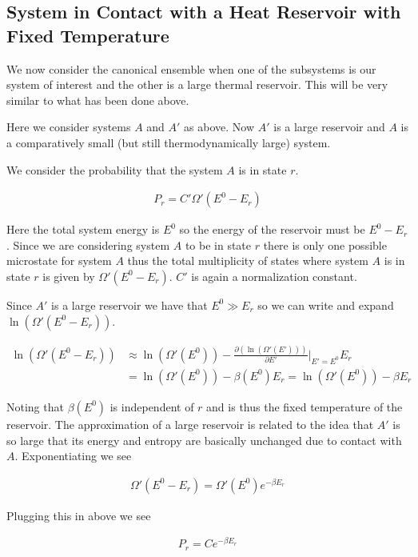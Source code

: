 \documentclass[12pt]{article}
\begin{document}
\subsection{System in Contact with a Heat Reservoir with Fixed Temperature}

We now consider the canonical ensemble when one of the subsystems is our system of interest and the other is a large thermal reservoir. This will be very similar to what has been done above.

Here we consider systems $A$ and $A'$ as above. Now $A'$ is a large reservoir and $A$ is a comparatively small (but still thermodynamically large) system.

We consider the probability that the system $A$ is in state $r$.

\begin{align}
P_r = C' \Omega'(E^0-E_r)
\end{align}

Here the total system energy is $E^0$ so the energy of the reservoir must be $E^0-E_r$. Since we are considering system $A$ to be in state $r$ there is only one possible microstate for system $A$ thus the total multiplicity of states where system $A$ is in state $r$ is given by $\Omega'(E^0-E_r)$. $C'$ is again a normalization constant.

Since $A'$ is a large reservoir we have that $E^0 \gg E_r$ so we can write and expand $\ln(\Omega'(E^0-E_r))$.

\begin{align}
\ln(\Omega'(E^0-E_r)) &\approx \ln(\Omega'(E^0)) - \frac{\partial(\ln(\Omega'(E')))}{\partial E'}\rvert_{E'=E^0} E_r\\
&= \ln(\Omega'(E^0)) - \beta(E^0)E_r = \ln(\Omega'(E^0)) - \beta E_r
\end{align}

Noting that $\beta(E^0)$ is independent of $r$ and is thus the fixed temperature of the reservoir. The approximation of a large reservoir is related to the idea that $A'$ is so large that its energy and entropy are basically unchanged due to contact with $A$.
Exponentiating we see

\begin{align}
\Omega'(E^0-E_r) = \Omega'(E^0) e^{-\beta E_r}
\end{align}

Plugging this in above we see

\begin{align}
P_r = C e^{-\beta E_r}
\end{align}
\end{document}
